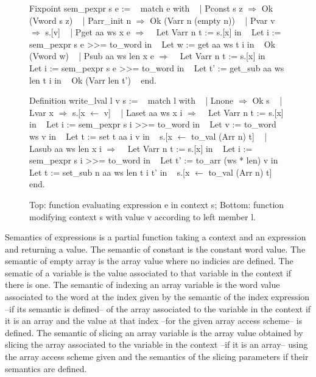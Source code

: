 \documentclass{article}
\begin{document}
\begin{figure}
\obeylines\obeyspaces\ttfamily%
Fixpoint sem\_pexpr s e :=
~ match e with
~ | Pconst s z \(\Rightarrow\) Ok (Vword s z)
~ | Parr\_init n \(\Rightarrow\) Ok (Varr n (empty n))
~ | Pvar v \(\Rightarrow\) s.[v]
~ | Pget aa ws x e \(\Rightarrow\)
~   Let Varr n t := s.[x] in
~   Let i := sem\_pexpr s e >{}>= to\_word in
~   Let w := get aa ws t i in
~   Ok (Vword w)
~ | Psub aa ws len x e \(\Rightarrow\)
~   Let Varr n t := s.[x] in
~   Let i := sem\_pexpr s e >{}>= to\_word in
~   Let t' := get\_sub aa ws len t i in
~   Ok (Varr len t')
~ end.

Definition write\_lval l v s :=
~ match l with
~ | Lnone \(\Rightarrow\) Ok s
~ | Lvar x \(\Rightarrow\) s.[x \(\leftarrow\) v]
~ | Laset aa ws x i \(\Rightarrow\)
~   Let Varr n t := s.[x] in
~   Let i := sem\_pexpr s i >{}>= to\_word in
~   Let v := to\_word ws v in
~   Let t := set t aa i v in
~   s.[x \(\leftarrow\) to\_val (Arr n) t]
~ | Lasub aa ws len x i \(\Rightarrow\)
~   Let Varr n t := s.[x] in
~   Let i := sem\_pexpr s i >{}>= to\_word in
~   Let t' := to\_arr (ws * len) v in 
~   Let t := set\_sub n aa ws len t i t' in
~   s.[x \(\leftarrow\) to\_val (Arr n) t]
~ end.
\normalfont%
\caption{Top: function evaluating expression e in context s; %
Bottom: function modifying context s with value v according to left member l.}
\end{figure}

Semantics of expressions is a partial function taking a context and an
expression and returning a value.
The semantic of constant is the constant word value. The semantic of empty array
is the array value where no indicies are defined. The sematic of a variable is
the value associated to that variable in the context if there is one. The
semantic of indexing an array variable is the word value associated to the word
at the index given by the semantic of the index expression --if its semantic
is defined-- of the array associated to the variable in the context if it is an
array and the value at that index --for the given array access scheme-- is
defined. The semantic of slicing an array variable is the array value obtained
by slicing the array associated to the variable in the context --if it is an
array-- using the array access scheme given and the semantics of the slicing
parameters if their semantics are defined.

\smallskip
\end{document}
